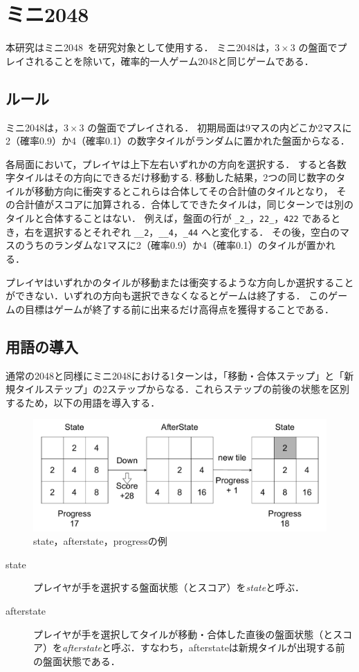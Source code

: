 \section{ミニ2048}
本研究はミニ2048~\cite{YaKN22J}を研究対象として使用する．
ミニ2048は，$3\times 3$ の盤面でプレイされることを除いて，確率的一人ゲーム{2048}と同じゲームである．

\subsection{ルール}

ミニ2048は，$3\times 3$ の盤面でプレイされる．
初期局面は9マスの内どこか2マスに2（確率0.9）か4（確率0.1）の数字タイルがランダムに置かれた盤面からなる．

各局面において，プレイヤは上下左右いずれかの方向を選択する．
すると各数字タイルはその方向にできるだけ移動する.
移動した結果，2つの同じ数字のタイルが移動方向に衝突するとこれらは合体してその合計値のタイルとなり，
その合計値がスコアに加算される．合体してできたタイルは，同じターンでは別のタイルと合体することはない．
例えば，盤面の行が \verb*|_2_|，\verb*|22_|，\verb*|422| であるとき，右を選択するとそれぞれ \verb*|__2|，\verb*|__4|，\verb*|_44| へと変化する．
その後，空白のマスのうちのランダムな1マスに2（確率0.9）か4（確率0.1）のタイルが置かれる．

プレイヤはいずれかのタイルが移動または衝突するような方向しか選択することができない．いずれの方向も選択できなくなるとゲームは終了する．
このゲームの目標はゲームが終了する前に出来るだけ高得点を獲得することである．

\subsection{用語の導入}
通常の2048と同様にミニ2048における1ターンは，「移動・合体ステップ」と「新規タイルステップ」の2ステップからなる．これらステップの前後の状態を区別するため，以下の用語を導入する．
\begin{figure}[t]
  \centering\includegraphics[width=.99\linewidth]{pdf/state_afterstate.drawio.pdf}
  \caption{state，afterstate，progressの例}
  \label{afterstate}
 \end{figure}
\begin{description}
  \item[state] プレイヤが手を選択する盤面状態（とスコア）を\emph{state}と呼ぶ．
  \item[afterstate] プレイヤが手を選択してタイルが移動・合体した直後の盤面状態（とスコア）を\emph{afterstate}と呼ぶ．すなわち，afterstateは新規タイルが出現する前の盤面状態である．
 \end{description}

